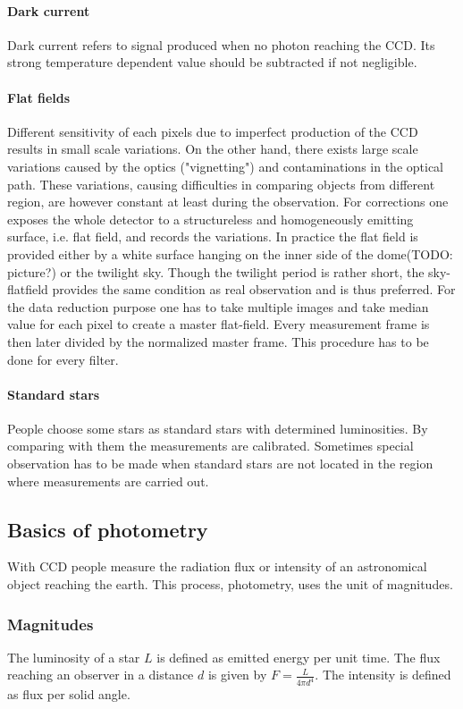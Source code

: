 \paragraph{Dark current}
Dark current refers to signal produced when no photon reaching the CCD. Its strong temperature dependent value should be subtracted if not negligible.

\paragraph{Flat fields}
Different sensitivity of each pixels due to imperfect production of the CCD results in small scale variations. On the other hand, there exists large scale variations caused by the optics ("vignetting") and contaminations in the optical path. These variations, causing difficulties in comparing objects from different region, are however constant at least during the observation. For corrections one exposes the whole detector to a structureless and homogeneously emitting surface, i.e. flat field, and records the variations. In practice the flat field is provided either by a white surface hanging on the inner side of the dome(TODO: picture?) or the twilight sky. Though the twilight period is rather short, the sky-flatfield provides the same condition as real observation and is thus preferred. For the data reduction purpose one has to take multiple images and take median value for each pixel to create a master flat-field. Every measurement frame is then later divided by the normalized master frame. This procedure has to be done for every filter.

\paragraph{Standard stars}
People choose some stars as standard stars with determined luminosities. By comparing with them the measurements are calibrated. Sometimes special observation has to be made when standard stars are not located in the region where measurements are carried out.

\subsection{Basics of photometry} \label{photometry}
With CCD people measure the radiation flux or intensity of an astronomical object reaching the earth. This process, photometry, uses the unit of magnitudes. 

\subsubsection{Magnitudes}
The luminosity of a star $L$ is defined as emitted energy per unit time. The flux reaching an observer in a distance $d$ is given by $F=\frac{L}{4\pi d^4}$. The intensity is defined as flux per solid angle. 


